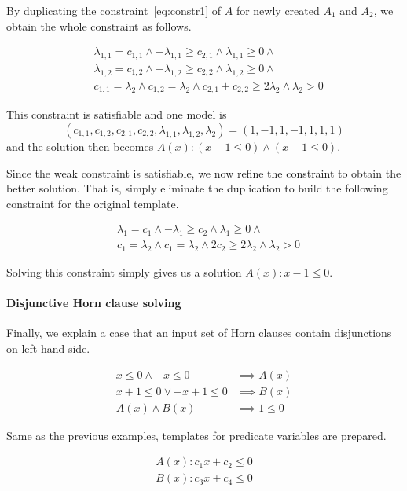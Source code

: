 \documentclass[a4paper,12pt]{article}
\begin{document}
By duplicating the constraint~\ref{eq:constr1} of $A$ for newly
created $A_1$ and $A_2$, we obtain the whole constraint as follows.

\begin{align*}
& \lambda_{1,1} = c_{1,1} \wedge - \lambda_{1,1} \geq c_{2,1} \wedge \lambda_{1,1} \geq 0 \wedge \\
& \lambda_{1,2} = c_{1,2} \wedge - \lambda_{1,2} \geq c_{2,2} \wedge \lambda_{1,2} \geq 0 \wedge \\
& c_{1,1} = \lambda_2 \wedge c_{1,2} = \lambda_2 \wedge c_{2,1} + c_{2,2} \geq 2 \lambda_2 \wedge \lambda_2 > 0
\end{align*}

This constraint is satisfiable and one model is
\[ ( c_{1,1}, c_{1,2}, c_{2,1}, c_{2,2}, \lambda_{1,1}, \lambda_{1,2}, \lambda_2 ) =
( 1, -1, 1, -1, 1, 1, 1 ) \] and the solution then becomes
$A(x) : (x -1 \leq 0) \wedge (x -1 \leq 0)$.

Since the weak constraint is satisfiable, we now refine the constraint
to obtain the better solution.  That is, simply eliminate the
duplication to build the following constraint for the original
template.

\begin{align*}
& \lambda_1 = c_1 \wedge - \lambda_1 \geq c_2 \wedge \lambda_1 \geq 0 \wedge \\
& c_1 = \lambda_2 \wedge c_1 = \lambda_2 \wedge 2 c_2 \geq 2 \lambda_2 \wedge \lambda_2 > 0
\end{align*}

Solving this constraint simply gives us a solution $A(x) : x -1 \leq 0$.

\paragraph {Disjunctive Horn clause solving}
Finally, we explain a case that an input set of Horn clauses contain
disjunctions on left-hand side.

\begin{align*}
x \leq 0 \wedge -x \leq 0 & \implies A(x) \\
x+1 \leq 0 \vee -x+1 \leq 0 & \implies B(x) \\
A(x) \wedge B(x) & \implies 1 \leq 0
\end{align*}

Same as the previous examples, templates for predicate variables are
prepared.

\begin{align*}
A(x) : c_1 x + c_2 \leq 0 \\ B(x) : c_3 x + c_4 \leq 0
\end{align*}
\end{document}
